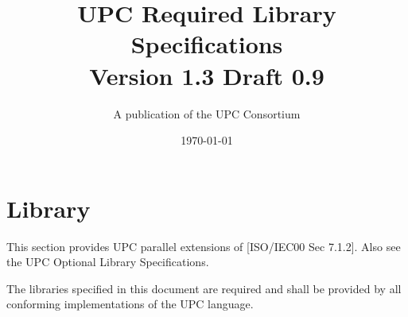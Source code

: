 \newcommand{\myversion}{Version 1.3 Draft 0.9}
\newcommand{\mytitle}{UPC Required Library Specifications}


\makeindex

\title{\mytitle\\
\myversion}

\author{A publication of the UPC Consortium}

\date {\today}



\maketitle

\setcounter{page}{2}

\setlength {\parskip}{0ex}
\tableofcontents                                             
\setlength {\parskip}{1.3ex}
\newpage

\pagebreak

\setcounter{section}{6} %
\section{Library}

\npf This section provides UPC parallel extensions of [ISO/IEC00 Sec 7.1.2]. Also see the UPC Optional Library Specifications.

\np The libraries specified in this document are required and shall be provided by all conforming implementations of the UPC language.

\setcounter{subsection}{2} %



\pagebreak
\setcounter{section}{0}
\printindex


